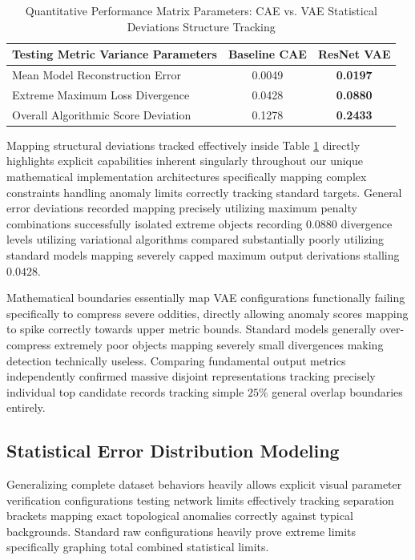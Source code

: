 \documentclass[conference]{IEEEtran}
\begin{document}
\begin{table}[htbp]
\caption{Quantitative Performance Matrix Parameters: CAE vs. VAE Statistical Deviations Structure Tracking}
\begin{center}
\renewcommand{\arraystretch}{1.3}
\begin{tabular}{|p{4.2cm}|c|c|}
\hline
\textbf{Testing Metric Variance Parameters} & \textbf{Baseline CAE} & \textbf{ResNet VAE} \\
\hline
Mean Model Reconstruction Error & 0.0049 & \textbf{0.0197} \\
\hline
Extreme Maximum Loss Divergence & 0.0428 & \textbf{0.0880} \\
\hline
Overall Algorithmic Score Deviation & 0.1278 & \textbf{0.2433} \\
\hline
\end{tabular}
\label{tab1}
\end{center}
\end{table}

Mapping structural deviations tracked effectively inside Table \ref{tab1} directly highlights explicit capabilities inherent singularly throughout our unique mathematical implementation architectures specifically mapping complex constraints handling anomaly limits correctly tracking standard targets. General error deviations recorded mapping precisely utilizing maximum penalty combinations successfully isolated extreme objects recording $0.0880$ divergence levels utilizing variational algorithms compared substantially poorly utilizing standard models mapping severely capped maximum output derivations stalling $0.0428$.

Mathematical boundaries essentially map VAE configurations functionally failing specifically to compress severe oddities, directly allowing anomaly scores mapping to spike correctly towards upper metric bounds. Standard models generally over-compress extremely poor objects mapping severely small divergences making detection technically useless. Comparing fundamental output metrics independently confirmed massive disjoint representations tracking precisely individual top candidate records tracking simple $25\%$ general overlap boundaries entirely.

\subsection{Statistical Error Distribution Modeling}
Generalizing complete dataset behaviors heavily allows explicit visual parameter verification configurations testing network limits effectively tracking separation brackets mapping exact topological anomalies correctly against typical backgrounds. Standard raw configurations heavily prove extreme limits specifically graphing total combined statistical limits.
\end{document}
